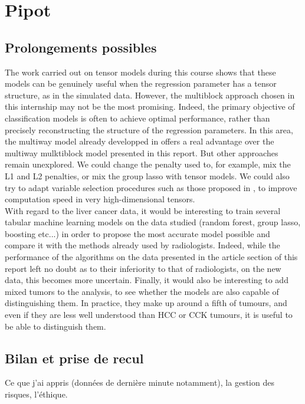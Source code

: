 \documentclass[preprint,12pt]{elsarticle}
\begin{document}
\section{Pipot}

\subsection{Prolongements possibles}

The work carried out on tensor models during this course shows that these models can be genuinely useful when the regression parameter has a tensor structure, as in the simulated data. However, the multiblock approach chosen in this internship may not be the most promising. Indeed, the primary objective of classification models is often to achieve optimal performance, rather than precisely reconstructing the structure of the regression parameters. In this area, the multiway model already developped in \cite{multi_rank_r} offers a real advantage over the multiway mulktiblock model presented in this report. But other approaches remain unexplored. We could change the penalty used to, for example, mix the L1 and L2 penalties, or mix the group lasso with tensor models. We could also try to adapt variable selection procedures such as those proposed in \cite{sis}, to improve computation speed in very high-dimensional tensors.\\
\indent With regard to the liver cancer data, it would be interesting to train several tabular machine learning models on the data studied (random forest, group lasso, boosting etc...) in order to propose the most accurate model possible and compare it with the methods already used by radiologists. Indeed, while the performance of the algorithms on the data presented in the article section of this report left no doubt as to their inferiority to that of radiologists, on the new data, this becomes more uncertain. Finally, it would also be interesting to add mixed tumors to the analysis, to see whether the models are also capable of distinguishing them. In practice, they make up around a fifth of tumours, and even if they are less well understood than HCC or CCK tumours, it is useful to be able to distinguish them.\\

\subsection{Bilan et prise de recul}

Ce que j'ai appris (données de dernière minute notamment), la gestion des risques, l'éthique.
\end{document}
